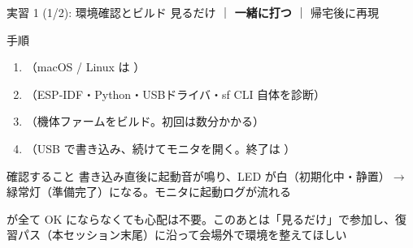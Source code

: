 \begin{frame}[fragile]{実習 1 (1/2): 環境確認とビルド}
  \vspace{0.15em}
  {\small 見るだけ ｜ \textcolor{sfblue}{\textbf{一緒に打つ}} ｜ 帰宅後に再現}

  \begin{block}{手順}
    \begin{enumerate}\footnotesize\setlength{\itemsep}{0pt}
      \item {}（macOS / Linux は ）
      \item {}（ESP-IDF・Python・USBドライバ・sf CLI 自体を診断）
      \item {}（機体ファームをビルド。初回は数分かかる）
      \item {}（USB で書き込み、続けてモニタを開く。終了は \code{Ctrl+]}）
    \end{enumerate}
  \end{block}

  \begin{exampleblock}{確認すること}
    \footnotesize 書き込み直後に起動音が鳴り、LED が白（初期化中・静置）$\to$ 緑常灯（準備完了）になる。モニタに起動ログが流れる
  \end{exampleblock}

  {\footnotesize {} が全て OK にならなくても心配は不要。このあとは「見るだけ」で参加し、復習パス（本セッション末尾）に沿って会場外で環境を整えてほしい}
\end{frame}

